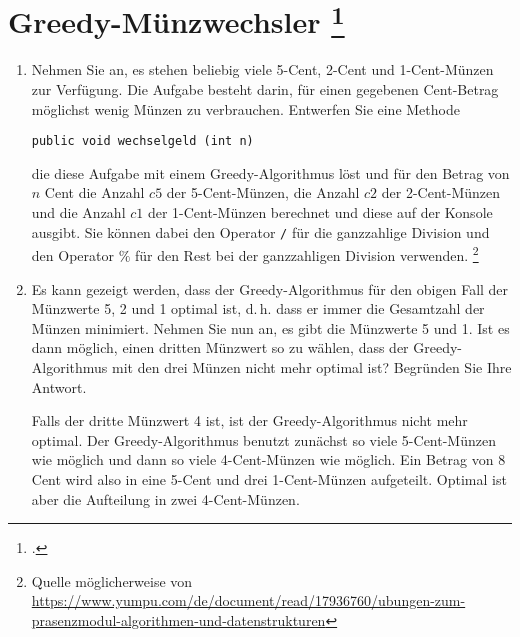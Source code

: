 \documentclass{lehramt-informatik-aufgabe}
\begin{document}

\section{Greedy-Münzwechsler
\footcite[Seite 1, Aufgabe 1: Greedy-Münzwechsler]{aud:ab:3}}

\begin{enumerate}


\item Nehmen Sie an, es stehen beliebig viele 5-Cent, 2-Cent und
1-Cent-Münzen zur Verfügung. Die Aufgabe besteht darin, für einen
gegebenen Cent-Betrag möglichst wenig Münzen zu verbrauchen. Entwerfen
Sie eine Methode

\begin{verbatim}
public void wechselgeld (int n)
\end{verbatim}

die diese Aufgabe mit einem Greedy-Algorithmus löst und für den Betrag
von $n$ Cent die Anzahl $c5$ der 5-Cent-Münzen, die Anzahl $c2$ der
2-Cent-Münzen und die Anzahl $c1$ der 1-Cent-Münzen berechnet und diese
auf der Konsole ausgibt. Sie können dabei den Operator \texttt{/} für
die ganzzahlige Division und den Operator $\%$ für den Rest bei der
ganzzahligen Division verwenden.
\footnote{Quelle möglicherweise von \url{https://www.yumpu.com/de/document/read/17936760/ubungen-zum-prasenzmodul-algorithmen-und-datenstrukturen}}

\begin{antwort}
\end{antwort}


\item Es kann gezeigt werden, dass der Greedy-Algorithmus für den obigen
Fall der Münzwerte 5, 2 und 1 optimal ist, d.\,h. dass er immer die
Gesamtzahl der Münzen minimiert. Nehmen Sie nun an, es gibt die
Münzwerte 5 und 1. Ist es dann möglich, einen dritten Münzwert so zu
wählen, dass der Greedy-Algorithmus mit den drei Münzen nicht mehr
optimal ist? Begründen Sie Ihre Antwort.

\begin{antwort}
Falls der dritte Münzwert 4 ist, ist der Greedy-Algorithmus nicht mehr
optimal. Der Greedy-Algorithmus benutzt zunächst so viele 5-Cent-Münzen
wie möglich und dann so viele 4-Cent-Münzen wie möglich. Ein Betrag von
8 Cent wird also in eine 5-Cent und drei 1-Cent-Münzen aufgeteilt.
Optimal ist aber die Aufteilung in zwei 4-Cent-Münzen.
\end{antwort}
\end{enumerate}
\end{document}
